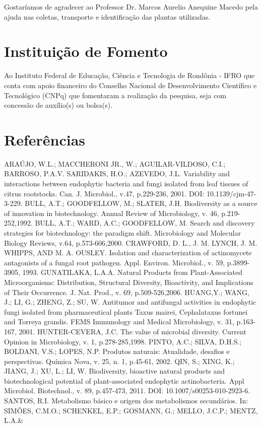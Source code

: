 \documentclass[article,12pt,onesidea,4paper,english,brazil]{abntex2}
\begin{document}
	Gostaríamos de agradecer ao Professor Dr. Marcos Aurelio Anequine Macedo pela ajuda nas coletas, transporte e identificação das plantas utilizadas.
	
	\section*{Instituição de Fomento}
	
	Ao Instituto Federal de Educação, Ciência e Tecnologia de Rondônia - IFRO que conta com apoio financeiro do Conselho Nacional de Desenvolvimento Científico e Tecnológico (CNPq) que fomentaram a realização da pesquisa, seja com concessão de auxílio(s) ou bolsa(s).
	
	\sloppy
	\section*{Referências}
	
	\noindent ARAÚJO, W.L.; MACCHERONI JR., W.; AGUILAR-VILDOSO, C.I.; BARROSO, P.A.V. SARIDAKIS, H.O.; AZEVEDO, J.L. Variability and interactions between endophytic bacteria and fungi isolated from leaf tissues of citrus rootstocks. Can. J. Microbiol., v.47, p.229-236, 2001. DOI: 10.1139/cjm-47-3-229.
	\noindent BULL, A.T.; GOODFELLOW, M.; SLATER, J.H. Biodiversity as a  source  of innovation in biotechnology. Annual Review of Microbiology, v. 46, p.219-252,1992.
	\noindent BULL, A.T.; WARD, A.C.; GOODFELLOW, M. Search and discovery strategies for biotechnology: the paradigm shift. Microbiology  and  Molecular  Biology  Reviews,  v.64, p.573-606,2000.
	\noindent CRAWFORD, D. L., J. M. LYNCH, J. M. WHIPPS, AND M. A. OUSLEY. Isolation and
	characterization of actinomycete antagonists of a fungal root pathogen. Appl. Environ. Microbiol., v. 59, p.3899-3905, 1993.
	\noindent GUNATILAKA, L.A.A. Natural Products from Plant-Associated Microorganisms: Distribution, Structural Diversity, Bioactivity,  and  Implications  of  Their Occurrence. J. Nat. Prod., v. 69, p.509-526,2006.
	\noindent HUANG,Y.; WANG, J.; LI, G.; ZHENG, Z.; SU, W. Antitumor  and  antifungal  activities in endophytic fungi isolated from pharmaceutical plants Taxus mairei, Cephalataxus fortunei and Torreya grandis. FEMS Immunology and Medical Microbiology, v. 31, p.163-167, 2001.
	\noindent HUNTER-CEVERA,   J.C.   The   value    of    microbial   diversity.    Current    Opinion in Microbiology, v. 1, p.278-285,1998.
	\noindent PINTO, A.C.; SILVA, D.H.S.; BOLDANI, V.S.; LOPES, N.P. Produtos naturais: Atualidade, desafios e perspectivas. Química Nova, v. 25, n. 1, p.45-61, 2002.
	\noindent QIN, S.; XING, K.; JIANG, J.; XU, L.; LI, W. Biodiversity, bioactive natural products and biotechnological potential of plant-associated endophytic actinobacteria. Appl Microbiol. Biotechnol., v. 89, p.457-473, 2011. DOI: 10.1007/s00253-010-2923-6.
	\noindent SANTOS, R.I. Metabolismo básico e origem dos metabolismos secundários. In: SIMÕES, C.M.O.; SCHENKEL, E.P.; GOSMANN, G.; MELLO, J.C.P.; MENTZ, L.A.\&
	
	
\end{document}
